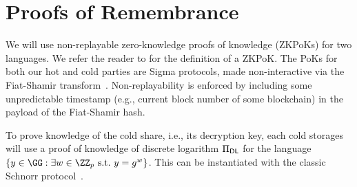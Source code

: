 \section{Proofs of Remembrance}\label{sec:hotproofs}


We will use non-replayable zero-knowledge proofs of knowledge (ZKPoKs) for two languages. We refer the reader to \cite{Thaler23} for the definition of a ZKPoK. The PoKs for both our hot and cold parties are Sigma protocols, made non-interactive via the Fiat-Shamir transform~\cite{C:FiaSha86}. Non-replayability is enforced by including some unpredictable timestamp (e.g., current block number of some blockchain) in the payload of the Fiat-Shamir hash.


To prove knowledge of the cold share, i.e., its decryption key, each cold storages will use a proof of knowledge of discrete logarithm $\Pi_{\sf DL}$ for the language $\{y \in \GG : \exists w \in \ZZ_p ~\text{s.t.}\ y = g^w\}$. This can be instantiated with the classic Schnorr protocol~\cite{C:Schnorr89}.

